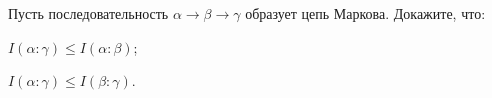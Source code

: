 Пусть последовательность $\alpha \to \beta \to \gamma$ образует цепь Маркова. Докажите, что:
\begin{enumcyr}
    \item $I(\alpha : \gamma) \le I(\alpha : \beta)$;
    \item $I(\alpha : \gamma) \le I(\beta : \gamma)$.
\end{enumcyr}
